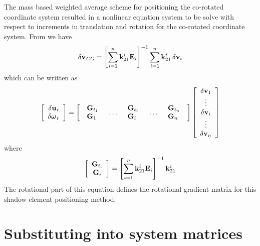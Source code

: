 {The mass based weighted average scheme for positioning the co-rotated coordinate
system resulted in a nonlinear equation system to be solve with respect to
increments in translation and rotation for the co-rotated coordinate system.
From  we have
%
\begin{equation}
\delta{\bf v}_\textit{CG} =
\left[\sum_{i=1}^n{\bf k}^i_{21}{\bf E}_i\right]^{-1}
\sum_{i=1}^n{\bf k}^i_{21}\,\delta{\bf v}_i
\end{equation}
%
which can be written as
%
\begin{equation}
\left[\begin{array}{c}
\delta{\bf u}_\textit{r} \\ \delta{\boldsymbol{\omega}}_r
\end{array}\right] = \left[\begin{array}{ccccc}
\begin{array}{l} {\bf G}_{t_1} \\ {\bf G}_1 \end{array} &\hdots&
\begin{array}{l} {\bf G}_{t_i} \\ {\bf G}_i \end{array} &\hdots&
\begin{array}{l} {\bf G}_{t_n} \\ {\bf G}_n \end{array}
\end{array}\right]
\left[\begin{array}{c}
\delta{\bf v}_1 \\ \vdots \\ \delta{\bf v}_i \\ \vdots \\ \delta{\bf v}_n
\end{array}\right]
\end{equation}
%
where
%
\begin{equation}
\left[\begin{array}{c} {\bf G}_{t_i} \\ {\bf G}_{i}\end{array}\right] =
\left[\sum_{i=1}^n{\bf k}^i_{21}{\bf E}_i\right]^{-1} {\bf k}^i_{21}
\end{equation}
%
The rotational part of this equation defines the rotational gradient matrix
for this shadow element positioning method.

\section{Substituting into system matrices}
\label{s:Substituting into system matrices}

}
